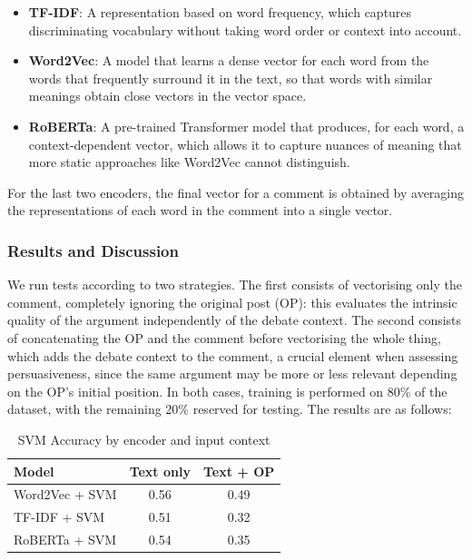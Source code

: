 \documentclass[11pt,a4paper]{article}
\begin{document}
\begin{itemize}
    \item \textbf{TF-IDF}: A representation based on word frequency, which
    captures discriminating vocabulary without taking word order or context
    into account.
    \item \textbf{Word2Vec}: A model that learns a dense vector for each word
    from the words that frequently surround it in the text, so that words with
    similar meanings obtain close vectors in the vector space.
    \item \textbf{RoBERTa}: A pre-trained Transformer model that produces, for
    each word, a context-dependent vector, which allows it to capture nuances
    of meaning that more static approaches like Word2Vec cannot distinguish.
\end{itemize}

For the last two encoders, the final vector for a comment is obtained by
averaging the representations of each word in the comment into a single vector.

\subsubsection{Results and Discussion}

We run tests according to two strategies. The first consists of vectorising
only the comment, completely ignoring the original post (OP): this evaluates
the intrinsic quality of the argument independently of the debate context.
The second consists of concatenating the OP and the comment before vectorising
the whole thing, which adds the debate context to the comment, a crucial
element when assessing persuasiveness, since the same argument may be more or
less relevant depending on the OP's initial position. In both cases, training
is performed on 80\% of the dataset, with the remaining 20\% reserved for
testing. The results are as follows:
\vspace{0.2cm}
\begin{table}[h]
\centering
\begin{tabular}{lcc}
\toprule
\textbf{Model} & \textbf{Text only} & \textbf{Text + OP} \\
\midrule
Word2Vec + SVM  & 0.56 & 0.49 \\
TF-IDF + SVM    & 0.51 & 0.32 \\
RoBERTa + SVM   & 0.54 & 0.35 \\
\bottomrule
\end{tabular}
\caption{SVM Accuracy by encoder and input context}
\label{tab:axe1_results}
\end{table}
\end{document}
